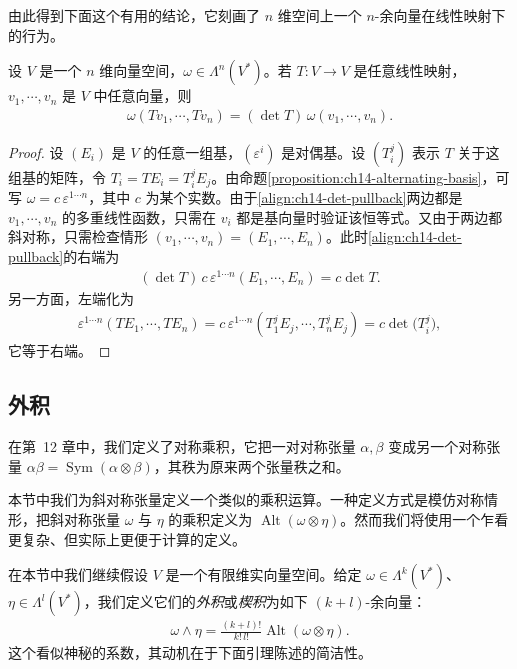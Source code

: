 \documentclass[../../main.tex]{subfiles}
\begin{document}
由此得到下面这个有用的结论，它刻画了 $n$ 维空间上一个 $n$-余向量在线性映射下的行为。

\begin{proposition}\label{proposition:ch14-n-covector-det}
设 $V$ 是一个 $n$ 维向量空间，$\omega\in\Lambda^n(V^*)$。若 $T:V\to V$ 是任意线性映射，$v_1,\cdots ,v_n$ 是 $V$ 中任意向量，则
\begin{align}
\omega(Tv_1,\cdots ,Tv_n)=(\det T)\,\omega(v_1,\cdots ,v_n).\label{align:ch14-det-pullback}
\end{align}
\end{proposition}

\begin{proof}
设 $(E_i)$ 是 $V$ 的任意一组基，$(\varepsilon^i)$ 是对偶基。设 $(T^j_i)$ 表示 $T$ 关于这组基的矩阵，令 $T_i=TE_i=T^j_iE_j$。由命题\ref{proposition:ch14-alternating-basis}，可写 $\omega=c\,\varepsilon^{1\cdots  n}$，其中 $c$ 为某个实数。由于\eqref{align:ch14-det-pullback}两边都是 $v_1,\cdots ,v_n$ 的多重线性函数，只需在 $v_i$ 都是基向量时验证该恒等式。又由于两边都斜对称，只需检查情形 $(v_1,\cdots ,v_n)=(E_1,\cdots ,E_n)$。此时\eqref{align:ch14-det-pullback}的右端为
\begin{align*}
(\det T)\,c\,\varepsilon^{1\cdots  n}(E_1,\cdots ,E_n)=c\det T.
\end{align*}
另一方面，左端化为
\begin{align*}
\varepsilon^{1\cdots  n}(TE_1,\cdots ,TE_n)
=c\,\varepsilon^{1\cdots  n}(T^j_1E_j,\cdots ,T^j_nE_j)
=c\det\bigl(T^j_i\bigr),
\end{align*}
它等于右端。
\end{proof}

\subsection{外积}

在第~12 章中，我们定义了对称乘积，它把一对对称张量 $\alpha,\beta$ 变成另一个对称张量 $\alpha\beta=\operatorname{Sym}(\alpha\otimes\beta)$，其秩为原来两个张量秩之和。

本节中我们为斜对称张量定义一个类似的乘积运算。一种定义方式是模仿对称情形，把斜对称张量 $\omega$ 与 $\eta$ 的乘积定义为 $\operatorname{Alt}(\omega\otimes\eta)$。然而我们将使用一个乍看更复杂、但实际上更便于计算的定义。

在本节中我们继续假设 $V$ 是一个有限维实向量空间。给定 $\omega\in\Lambda^k(V^*)$、$\eta\in\Lambda^l(V^*)$，我们定义它们的\emph{外积}或\emph{楔积}为如下 $(k+l)$-余向量：
\begin{align}
\omega\wedge\eta=\frac{(k+l)!}{k!\,l!}\operatorname{Alt}(\omega\otimes\eta).\label{align:ch14-wedge-def}
\end{align}
这个看似神秘的系数，其动机在于下面引理陈述的简洁性。
\end{document}
